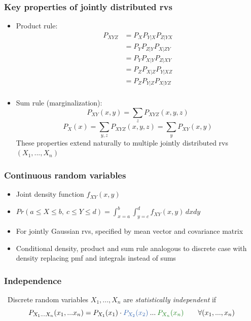 \documentclass[24pt]{article}
\begin{document}
\subsubsection{Key properties of jointly distributed rvs}
\begin{itemize}
\item Product rule:
\begin{align*}
P_{XYZ} &= P_XP_{Y|X}P_{Z|YX} \\
&= P_YP_{Z|Y}P_{X|ZY}\\
&= P_YP_{X|Y}P_{Z|XY}\\
&= P_ZP_{X|Z}P_{Y|XZ}\\
& = P_ZP_{Y|Z}P_{X|YZ}\\
\end{align*}

\item Sum rule (marginalization):
$$ P_{XY}(x,y) = \sum_zP_{XYZ}(x,y,z)$$
$$ P_X(x) = \sum_{y,z}P_{XYZ}(x,y,z) = \sum_yP_{XY}(x,y)$$
These properties extend naturally to multiple jointly distributed rvs $(X_1,...,X_n)$
\end{itemize}

\subsubsection{Continuous random variables}
\begin{itemize}
\item Joint density function $f_{XY}(x,y)$

\item $Pr(a \le X \le b, \ c \le Y \le d) = \int_{x = a}^{b} \int_{y=c}^{d}f_{XY}(x,y) \,dxdy$

\item For jointly Gaussian rvs, specified by mean vector and covariance matrix

\item Conditional density, product and sum rule analogous to discrete case with density replacing pmf and integrals instead of sums
\end{itemize}

\subsubsection{Independence}
\quad \ \. Discrete random variables $X_1,...,X_n$ are \textit{statistically \textcolor{blue1}{independent}} if 
$$P_{X_1...X_n}(x_1,...x_n) = P_{X_1}(x_1) \cdot  \textcolor{blue1}{P_{X_2}(x_2)} \: ... \: \textcolor{green}{P_{X_n}(x_n)} \qquad \forall (x_1,...,x_n)$$
\end{document}
